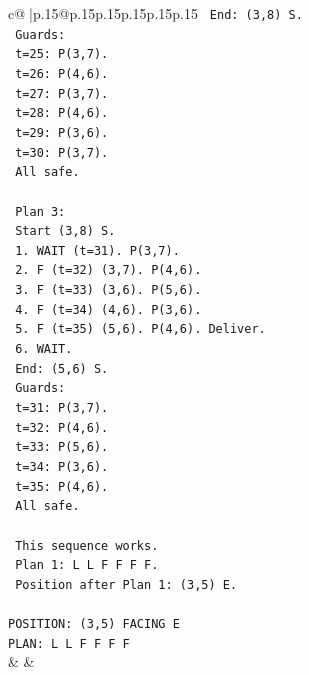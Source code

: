 \documentclass{article}
\begin{document}
{\begin{supertabular}{c@{$\;$}|p{.15\linewidth}@{}p{.15\linewidth}p{.15\linewidth}p{.15\linewidth}p{.15\linewidth}p{.15\linewidth}}
{{{\texttt{   End: (3,8) S.} \\
\texttt{   Guards:} \\
\texttt{   t=25: P(3,7).} \\
\texttt{   t=26: P(4,6).} \\
\texttt{   t=27: P(3,7).} \\
\texttt{   t=28: P(4,6).} \\
\texttt{   t=29: P(3,6).} \\
\texttt{   t=30: P(3,7).} \\
\texttt{   All safe.} \\
\\ 
\texttt{   Plan 3:} \\
\texttt{   Start (3,8) S.} \\
\texttt{   1. WAIT (t=31). P(3,7).} \\
\texttt{   2. F (t=32) (3,7). P(4,6).} \\
\texttt{   3. F (t=33) (3,6). P(5,6).} \\
\texttt{   4. F (t=34) (4,6). P(3,6).} \\
\texttt{   5. F (t=35) (5,6). P(4,6). Deliver.} \\
\texttt{   6. WAIT.} \\
\texttt{   End: (5,6) S.} \\
\texttt{   Guards:} \\
\texttt{   t=31: P(3,7).} \\
\texttt{   t=32: P(4,6).} \\
\texttt{   t=33: P(5,6).} \\
\texttt{   t=34: P(3,6).} \\
\texttt{   t=35: P(4,6).} \\
\texttt{   All safe.} \\
\\ 
\texttt{   This sequence works.} \\
\texttt{   Plan 1: L L F F F F.} \\
\texttt{   Position after Plan 1: (3,5) E.} \\
\\ 
\texttt{POSITION: (3,5) FACING E} \\
\texttt{PLAN: L L F F F F} \\
            }
        }
    }
    & & \\ \\


\end{supertabular}}
\end{document}
